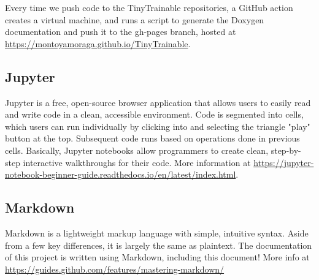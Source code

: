 Every time we push code to the TinyTrainable repositories, a GitHub action creates a virtual machine, and runs a script to generate the Doxygen documentation and push it to the gh-pages branch, hosted at \url{https://montoyamoraga.github.io/TinyTrainable}.

\subsection{Jupyter}

Jupyter is a free, open-source browser application that allows users to easily read and write code in a clean, accessible environment. Code is segmented into cells, which users can run individually by clicking into and selecting the triangle "play" button at the top. Subsequent code runs based on operations done in previous cells. Basically, Jupyter notebooks allow programmers to create clean, step-by-step interactive walkthroughs for their code. More information at \url{https://jupyter-notebook-beginner-guide.readthedocs.io/en/latest/index.html}.

\subsection{Markdown}

Markdown is a lightweight markup language with simple, intuitive syntax. Aside from a few key differences, it is largely the same as plaintext. The documentation of this project is written using Markdown, including this document! More info at \url{https://guides.github.com/features/mastering-markdown/}
